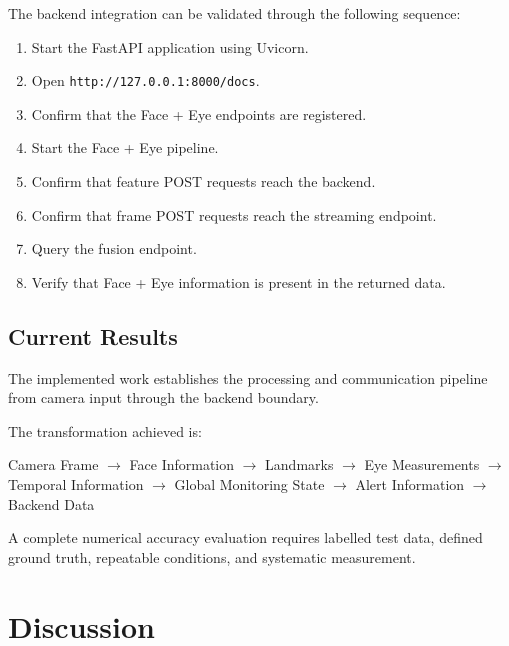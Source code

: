 \documentclass{tietreport}
\begin{document}
The backend integration can be validated through the following
sequence:

\begin{enumerate}
    \item Start the FastAPI application using Uvicorn.
    \item Open \texttt{http://127.0.0.1:8000/docs}.
    \item Confirm that the Face + Eye endpoints are registered.
    \item Start the Face + Eye pipeline.
    \item Confirm that feature POST requests reach the backend.
    \item Confirm that frame POST requests reach the streaming endpoint.
    \item Query the fusion endpoint.
    \item Verify that Face + Eye information is present in the returned
    data.
\end{enumerate}


\section{Current Results}

The implemented work establishes the processing and communication
pipeline from camera input through the backend boundary.

The transformation achieved is:

\begin{center}

Camera Frame
$\rightarrow$
Face Information
$\rightarrow$
Landmarks
$\rightarrow$
Eye Measurements
$\rightarrow$
Temporal Information
$\rightarrow$
Global Monitoring State
$\rightarrow$
Alert Information
$\rightarrow$
Backend Data

\end{center}

A complete numerical accuracy evaluation requires labelled test data,
defined ground truth, repeatable conditions, and systematic measurement.


\chapter{Discussion}
\end{document}
